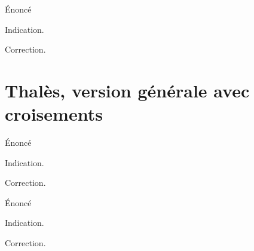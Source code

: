 \begin{exo}
Énoncé
\begin{hint}
Indication.
\end{hint}
\begin{sol}
Correction.
\end{sol}
\end{exo}

\section{Thalès, version générale avec croisements}

\begin{exo}
Énoncé
\begin{hint}
Indication.
\end{hint}
\begin{sol}
Correction.
\end{sol}
\end{exo}

\begin{exo}
Énoncé
\begin{hint}
Indication.
\end{hint}
\begin{sol}
Correction.
\end{sol}
\end{exo}


